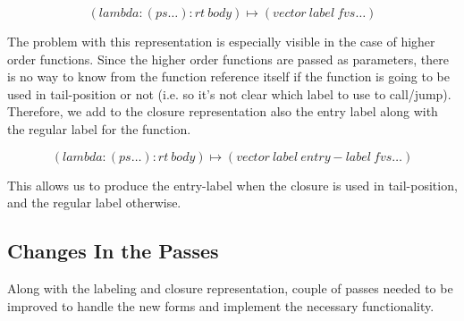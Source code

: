 \documentclass[12pt]{article}
\begin{document}
\begin{equation*}
(lambda: (ps \ldots) : rt\ body) \mapsto (vector\ label\ fvs \ldots)
\end{equation*}

The problem with this representation is especially visible in the case
of higher order functions. Since the higher order functions are passed
as parameters, there is no way to know from the function reference
itself if the function is going to be used in tail-position or not
(i.e. so it's not clear which label to use to call/jump). Therefore,
we add to the closure representation also the entry label along with
the regular label for the function.

\begin{equation*}
(lambda: (ps \ldots) : rt\ body) \mapsto (vector\ label\ entry-label\ fvs \ldots)
\end{equation*}

This allows us to produce the entry-label when the closure is used in
tail-position, and the regular label otherwise.

\subsection{Changes In the Passes}

Along with the labeling and closure representation, couple of passes
needed to be improved to handle the new forms and implement the
necessary functionality.
\end{document}

